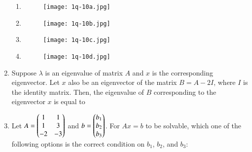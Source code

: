 \documentclass[journal,12pt,onecolumn]{article}
\theoremstyle{remark}
\begin{document}
\begin{enumerate}
\hfill{}
\begin{enumerate}
\item \begin{figure}[H]
    \centering
    \texttt{[image: 1q-10a.jpg]}
    \caption{}
    \label{fig:q8}
\end{figure}
\item \begin{figure}[H]
    \centering
    \texttt{[image: 1q-10b.jpg]}
    \caption{}
    \label{fig:q8}
\end{figure}
\item \begin{figure}[H]
    \centering
    \texttt{[image: 1q-10c.jpg]}
    \caption{}
    \label{fig:q8}
\end{figure}
\item \begin{figure}[H]
    \centering
    \texttt{[image: 1q-10d.jpg]}
    \caption{}
    \label{fig:q8}
\end{figure}
\end{enumerate}

\item Suppose $\lambda$ is an eigenvalue of matrix $A$ and $x$ is the corresponding eigenvector. Let $x$ also be an eigenvector of the matrix $B = A - 2I$, where $I$ is the identity matrix. Then, the eigenvalue of $B$ corresponding to the eigenvector $x$ is equal to

\hfill{}
\begin{enumerate}
\end{enumerate}

\item Let $A = \begin{pmatrix}1 & 1 \\ 1 & 3 \\ -2 & -3\end{pmatrix}$ and $b = \begin{pmatrix}b_1 \\ b_2 \\ b_3\end{pmatrix}$. For $Ax=b$ to be solvable, which one of the following options is the correct condition on $b_1$, $b_2$, and $b_3$:

\hfill{}
\begin{enumerate}
\end{enumerate}


\end{enumerate}
\end{document}
